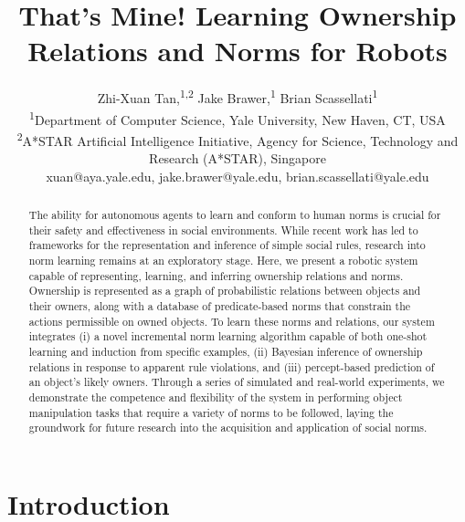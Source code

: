\documentclass[letterpaper]{article} %
\begin{document}
%
\title{That's Mine! Learning Ownership Relations and Norms for Robots}
\author{Zhi-Xuan Tan,\textsuperscript{1,2}
Jake Brawer,\textsuperscript{1}
Brian Scassellati\textsuperscript{1}\\
\textsuperscript{1}{Department of Computer Science, Yale University, New Haven, CT, USA}\\
\textsuperscript{2}{A*STAR Artificial Intelligence Initiative, Agency for Science, Technology and Research (A*STAR), Singapore}\\
xuan@aya.yale.edu, jake.brawer@yale.edu, brian.scassellati@yale.edu}

\maketitle
\begin{abstract}
The ability for autonomous agents to learn and conform to human norms is crucial for their safety and effectiveness in social environments. While recent work has led to frameworks for the representation and inference of simple social rules, research into norm learning remains at an exploratory stage. Here, we present a robotic system capable of representing, learning, and inferring ownership relations and norms. Ownership is represented as a graph of probabilistic relations between objects and their owners, along with a database of predicate-based norms that constrain the actions permissible on owned objects. To learn these norms and relations, our system integrates (i) a novel incremental norm learning algorithm capable of both one-shot learning and induction from specific examples, (ii) Bayesian inference of ownership relations in response to apparent rule violations, and (iii) percept-based prediction of an object's likely owners. Through a series of simulated and real-world experiments, we demonstrate the competence and flexibility of the system in performing object manipulation tasks that require a variety of norms to be followed, laying the groundwork for future research into the acquisition and application of social norms.
\end{abstract}

\section{Introduction}
\end{document}
